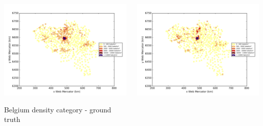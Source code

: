 \documentclass[c]{beamer}
\begin{document}
\begin{frame}
\begin{columns}
 \begin{column}{0.5\textwidth}
  \begin{overlayarea}{\linewidth}{4cm}
    \centering\vfill
    \includegraphics[scale=0.25]{../../data/Belgique/test/Support_Vector_Gaussian_Classification/Support_Vector_Gaussian_Classification/density_ground_truth.png}
  \end{overlayarea}
  \begin{overlayarea}{\linewidth}{0.5cm}
    \centering
    \tiny Belgium density category - ground truth\par
  \end{overlayarea}
 \end{column}
 \begin{column}{0.5\textwidth}
  \begin{overlayarea}{\linewidth}{4cm}
    \centering\vfill
    \includegraphics[scale=0.25]{../../data/Belgique/test/Support_Vector_Gaussian_Classification/Support_Vector_Gaussian_Classification/density_classification.png}

\end{overlayarea}
\end{column}
\end{columns}
\end{frame}
\end{document}
